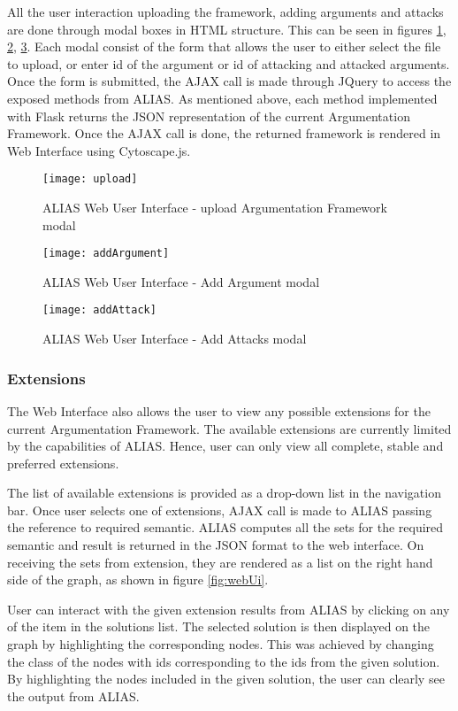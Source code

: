 All the user interaction uploading the framework, adding arguments and attacks are done through modal boxes in HTML structure. This can be seen in figures \ref{fig:upload}, \ref{fig:addArgument}, \ref{fig:addAttacks}. Each modal consist of the form that allows the user to either select the file to upload, or enter id of the argument or id of attacking and attacked arguments. Once the form is submitted, the AJAX call is made through JQuery to access the exposed methods from ALIAS. As mentioned above, each method implemented with Flask returns the JSON representation of the current Argumentation Framework. Once the AJAX call is done, the returned framework is rendered in Web Interface using Cytoscape.js.

\begin{figure}[!ht]
	\centering
	\texttt{[image: upload]}
	\caption{ALIAS Web User Interface - upload Argumentation Framework modal}
	\label{fig:upload}
\end{figure}

\begin{figure}[h]
	\centering
	\texttt{[image: addArgument]}
	\caption{ALIAS Web User Interface - Add Argument modal}
	\label{fig:addArgument}
\end{figure}

\begin{figure}[h]
	\centering
	\texttt{[image: addAttack]}
	\caption{ALIAS Web User Interface - Add Attacks modal}
	\label{fig:addAttacks}
\end{figure}

\subsubsection{Extensions}
The Web Interface also allows the user to view any possible extensions for the current Argumentation Framework. The available extensions are currently limited by the capabilities of ALIAS. Hence, user can only view all complete, stable and preferred extensions. 

The list of available extensions is provided as a drop-down list in the navigation bar. Once user selects one of extensions, AJAX call is made to ALIAS passing the reference to required semantic. ALIAS computes all the sets for the required semantic and result is returned in the JSON format to the web interface. On receiving the sets from extension, they are rendered as a list on the right hand side of the graph, as shown in figure \ref{fig:webUi}.

User can interact with the given extension results from ALIAS by clicking on any of the item in the solutions list. The selected solution is then displayed on the graph by highlighting the corresponding nodes. This was achieved by changing the class of the nodes with ids corresponding to the ids from the given solution. By highlighting the nodes included in the given solution, the user can clearly see the output from ALIAS.